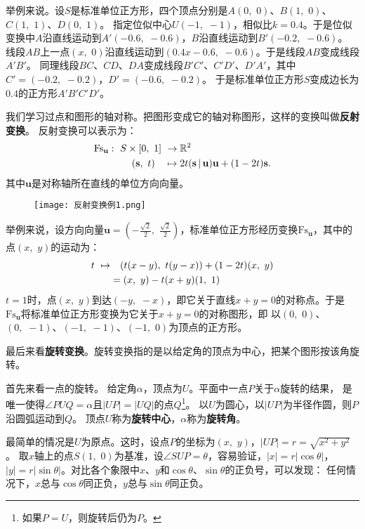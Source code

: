 \documentclass[12pt,UTF8]{ctexbook}
\begin{document}
举例来说。设$S$是标准单位正方形，四个顶点分别是$A(0,\,\,0)$、$B(1,\,\,0)$、$C(1,\,\,1)$、$D(0,\,\,1)$。
指定位似中心$U(-1,\,\,-1)$，相似比$k=0.4$。于是位似变换中$A$沿直线运动到$A'(-0.6,\,\,-0.6)$，$B$沿直线运动到$B'(-0.2,\,\,-0.6)$。
线段$AB$上一点$(x,\,\,0)$沿直线运动到$(0.4x - 0.6, \,\, -0.6)$。于是线段$AB$变成线段$A'B'$。
同理线段$BC$、$CD$、$DA$变成线段$B'C'$、$C'D'$、$D'A'$，其中$C'=(-0.2,\,\, -0.2)$，$D'=(-0.6,\,\,-0.2)$。
于是标准单位正方形$S$变成边长为$0.4$的正方形$A'B'C'D'$。

我们学习过点和图形的轴对称。把图形变成它的轴对称图形，这样的变换叫做\textbf{反射变换}。
反射变换可以表示为：
\begin{align}
    \mathrm{Fs}_\mathbf{u}: \,\, S\times[0,\,\,1] \,\,&\rightarrow \mathbb{R}^2 \notag \\
    (\mathbf{s},\,\, t) \quad &\mapsto 2t(\mathbf{s}\,|\,\mathbf{u})\mathbf{u} + (1 - 2t)\mathbf{s}. \notag
\end{align}
其中$\mathbf{u}$是对称轴所在直线的单位方向向量。

\begin{wrapfigure}[7]{r}{0.42\textwidth} %
    \vspace{-42pt}
    \flushright
    \texttt{[image: 反射变换例1.png]}
\end{wrapfigure}

举例来说，设方向向量$\mathbf{u} = \left(-\frac{\sqrt{2}}{2},\,\,\frac{\sqrt{2}}{2}\right)$，标准单位正方形经历变换$\mathrm{Fs}_\mathbf{u}$，其中的点$(x,\,\,y)$的运动为：
\begin{align}
    t \,\, \mapsto &\quad (t(x-y), \,\,t(y-x)) + (1 - 2t)(x, \,\,y) \notag \\
    & = (x, \,\,y) - t(x+y)(1, \,\, 1) \notag
\end{align}
$t=1$时，点$(x,\,\,y)$到达$(-y,\,\,-x)$，即它关于直线$x+y=0$的对称点。于是$\mathrm{Fs}_\mathbf{u}$将标准单位正方形变换为它关于$x+y=0$的对称图形，即
以$(0,\,\,0)$、$(0,\,\,-1)$、$(-1,\,\,-1)$、$(-1,\,\,0)$为顶点的正方形。

最后来看\textbf{旋转变换}。旋转变换指的是以给定角的顶点为中心，把某个图形按该角旋转。

首先来看一点的旋转。
给定角$\alpha$，顶点为$U$。平面中一点$P$关于$\alpha$旋转的结果，
是唯一使得$\angle PUQ = \alpha$且$|UP| = |UQ|$的点$Q$\footnote{如果$P=U$，则旋转后仍为$P$。}。
以$U$为圆心，以$|UP|$为半径作圆，则$P$沿圆弧运动到$Q$。
顶点$U$称为\textbf{旋转中心}，$\alpha$称为\textbf{旋转角}。

最简单的情况是$U$为原点。这时，设点$P$的坐标为$(x,\,\,y)$，$|UP| = r = \sqrt{x^2 + y^2}$。
取$x$轴上的点$S(1,\,\,0)$为基准，设$\angle SUP = \theta$，容易验证，$|x| = r|\cos{\theta}|$，
$|y| = r|\sin{\theta}|$。对比各个象限中$x$、$y$和$\cos{\theta}$、$\sin{\theta}$的正负号，可以发现：
任何情况下，$x$总与$\cos{\theta}$同正负，$y$总与$\sin{\theta}$同正负。
\end{document}
